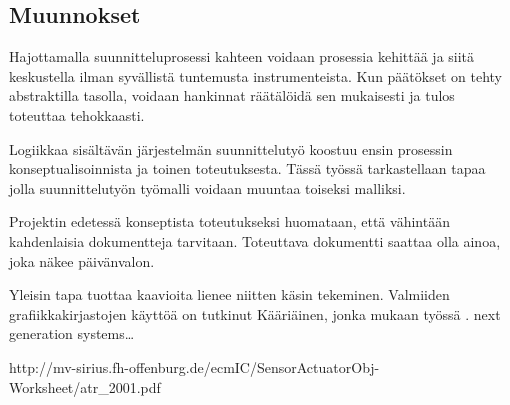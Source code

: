 \documentclass[finnish,12pt]{article}
\begin{document}
		\subsection{Muunnokset}

Hajottamalla suunnitteluprosessi kahteen voidaan prosessia kehittää ja siitä keskustella ilman syvällistä tuntemusta instrumenteista.
Kun päätökset on tehty abstraktilla tasolla, voidaan hankinnat räätälöidä sen mukaisesti ja tulos toteuttaa tehokkaasti.

Logiikkaa sisältävän järjestelmän suunnittelutyö koostuu ensin prosessin konseptualisoinnista ja toinen toteutuksesta.
Tässä työssä tarkastellaan tapaa jolla suunnittelutyön työmalli voidaan muuntaa toiseksi malliksi.

Projektin edetessä konseptista toteutukseksi huomataan, että vähintään kahdenlaisia dokumentteja tarvitaan.
Toteuttava dokumentti saattaa olla ainoa, joka näkee päivänvalon. 

Yleisin tapa tuottaa kaavioita lienee niitten käsin tekeminen.
Valmiiden grafiikkakirjastojen käyttöä on tutkinut Kääriäinen, jonka mukaan työssä .
next generation systems…

http://mv-sirius.fh-offenburg.de/ecmIC/SensorActuatorObj-Worksheet/atr_2001.pdf
\makeindex %
 
\end{document}
